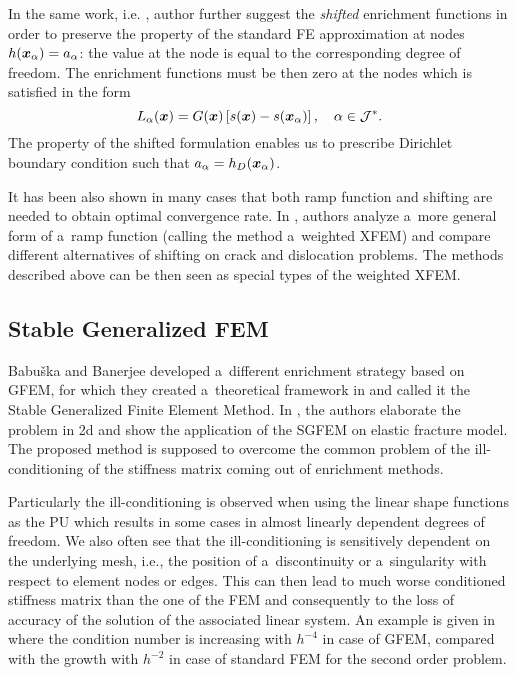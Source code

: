 In the same work, i.e. \cite{fries_corrected_2008}, author further suggest the \emph{shifted} enrichment functions in order 
to preserve the property of the standard 
FE approximation at nodes $h(\mathbf{\boldsymbol{x}}_\alpha)=a_\alpha$: the value at the node is equal to the corresponding degree
of freedom. The enrichment functions must be then zero at the nodes which is satisfied in the form
\begin{equation} \label{eqn:xfem_shift}
    L_{\alpha}(\mathbf{\boldsymbol{x}}) = G(\mathbf{\boldsymbol{x}}) \left[s(\mathbf{\boldsymbol{x}}) - s(\mathbf{\boldsymbol{x}}_\alpha)\right],
    \quad \alpha\in\mathcal{J}^*.
\end{equation} 
The property of the shifted formulation enables us to prescribe Dirichlet boundary condition such that
$a_\alpha = h_D(\mathbf{\boldsymbol{x}}_\alpha)$.

It has been also shown in many cases that both ramp function and shifting are needed to obtain optimal convergence rate.
In \cite{ventura_fast_2009}, authors analyze a~more general form of a~ramp function (calling the method a~weighted XFEM)
and compare different alternatives of shifting on crack and dislocation problems. The methods described above can be then seen
as special types of the weighted XFEM. 


\subsection{Stable Generalized FEM} \label{sec:stable_gfem}


Babuška and Banerjee developed a~different enrichment strategy based on GFEM,
for which they created a~theoretical framework in \cite{babuska_stable_2012} and
called it the Stable Generalized Finite Element Method.
In \cite{gupta_stable_2013}, the authors elaborate the problem in 2d and show the application of the SGFEM on elastic fracture model.
The proposed method is supposed to overcome the common problem of the ill-conditioning of the stiffness matrix coming out of enrichment methods.

Particularly the ill-conditioning is observed when using the linear shape functions as the PU which results in some cases in almost linearly dependent degrees of freedom.
We also often see that the ill-conditioning is sensitively dependent on the underlying mesh, i.e., the position of a~discontinuity or a~singularity with respect to 
element nodes or edges.
This can then lead to much worse conditioned stiffness matrix than the one of the FEM
and consequently to the loss of accuracy of the solution of the associated linear system.
An example is given in \cite{babuska_stable_2012} where the condition number is increasing with $h^{-4}$ in case of GFEM,
compared with the growth with $h^{-2}$ in case of standard FEM for the second order problem.

